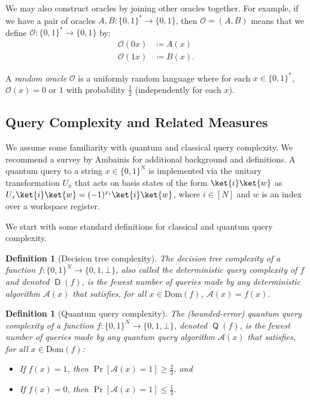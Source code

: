 \documentclass[11pt]{article}%
\newtheorem{definition}[theorem]{Definition}
\newcommand{\Dom}{\mathrm{Dom}}
\DeclareMathOperator{\D}{\mathsf{D}}
\DeclareMathOperator{\Q}{\mathsf{Q}}
\begin{document}
We may also construct oracles by joining other oracles together. For example, if we have a pair of oracles $A, B: \{0,1\}^* \to \{0,1\}$, then $\mathcal{O} = (A, B)$ means that we define $\mathcal{O}: \{0,1\}^* \to \{0,1\}$ by:
\begin{align*}
\mathcal{O}(0x) &\coloneqq A(x)\\
\mathcal{O}(1x) &\coloneqq B(x).
\end{align*}

A \textit{random oracle} $\mathcal{O}$ is a uniformly random language where for each $x \in \{0,1\}^*$, $\mathcal{O}(x) = 0$ or $1$ with probability $\frac{1}{2}$ (independently for each $x$).



\subsection{Query Complexity and Related Measures}
We assume some familiarity with quantum and classical query complexity. We recommend a survey by Ambainis \cite{Amb18} for additional background and definitions. A quantum query to a string $x \in \{0,1\}^N$ is implemented via the unitary transformation $U_x$ that acts on basis states of the form $\ket{i}\ket{w}$ as $U_x\ket{i}\ket{w} = (-1)^{x_i}\ket{i}\ket{w}$, where $i \in [N]$ and $w$ is an index over a workspace register.


We start with some standard definitions for classical and quantum query complexity.

\begin{definition}[Decision tree complexity]
The \emph{decision tree complexity} of a function $f: \{0,1\}^N \to \{0,1, \bot\}$, also called the \emph{deterministic query complexity} of $f$ and denoted $\D(f)$, is the fewest number of queries made by any deterministic algorithm $\mathcal{A}(x)$ that satisfies, for all $x \in \Dom(f)$, $\mathcal{A}(x) = f(x)$.
\end{definition}

\begin{definition}[Quantum query complexity]
The \emph{(bounded-error) quantum query complexity} of a function $f: \{0,1\}^N \to \{0,1,\bot\}$, denoted $\Q(f)$, is the fewest number of queries made by any quantum query algorithm $\mathcal{A}(x)$ that satisfies, for all $x \in \Dom(f)$:
\begin{itemize}
\item If $f(x) = 1$, then $\Pr\left[\mathcal{A}(x) = 1 \right] \ge \frac{2}{3}$, and
\item If $f(x) = 0$, then $\Pr\left[\mathcal{A}(x) = 1 \right] \le \frac{1}{3}$.
\end{itemize}
\end{definition}
\end{document}
